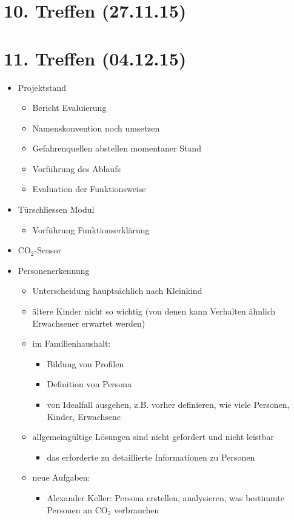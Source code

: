 \section{10. Treffen (27.11.15)}

\section{11. Treffen (04.12.15)}
\begin{itemize}
	\item Projektstand
	\begin{itemize}
		\item Bericht Evaluierung
		\item Namenskonvention noch umsetzen
		\item Gefahrenquellen abstellen momentaner Stand
		\item Vorführung des Ablaufs
		\item Evaluation der Funktionsweise
	\end{itemize}

	\item Türschliessen Modul
	\begin{itemize}
		\item Vorführung Funktionserklärung
	\end{itemize}

	\item CO$_2$-Sensor
	\item Personenerkennung
	\begin{itemize}
		\item Unterscheidung hauptsächlich nach Kleinkind
		\item ältere Kinder nicht so wichtig (von denen kann Verhalten ähnlich Erwachsener erwartet werden)
		\item im Familienhaushalt:
		\begin{itemize}
			\item Bildung von Profilen
			\item Definition von Persona
			\item von Idealfall ausgehen, z.B. vorher definieren, wie viele Personen, Kinder, Erwachsene
		\end{itemize}
	\item allgemeingültige Lösungen sind nicht gefordert und nicht leistbar
		\begin{itemize}
			\item das erforderte zu detaillierte Informationen zu Personen
		\end{itemize}
	\item neue Aufgaben:
		\begin{itemize}
			\item Alexander Keller: Persona erstellen, analysieren, was bestimmte Personen an CO$_2$ verbrauchen	
		\end{itemize}
	\end{itemize}


\end{itemize}
